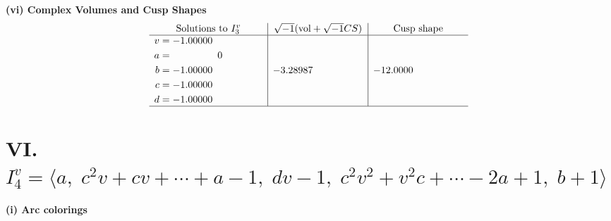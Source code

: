 \documentclass[1p]{elsarticle_modified}
\theoremstyle{definition}
\newcommand{\I}{\sqrt{-1}}
\begin{document}
\newpage\flushleft \textbf{(vi) Complex Volumes and Cusp Shapes}
$$\begin{array}{c|c|c}  
\text{Solutions to }I^v_{3}& \I (\text{vol} + \sqrt{-1}CS) & \text{Cusp shape}\\
 \hline 
\begin{aligned}
v &= -1.00000\phantom{ +0.000000I} \\
a &= \phantom{-0.000000 } 0 \\
b &= -1.00000\phantom{ +0.000000I} \\
c &= -1.00000\phantom{ +0.000000I} \\
d &= -1.00000\phantom{ +0.000000I}\end{aligned}
 & -3.28987\phantom{ +0.000000I} & -12.0000\phantom{ +0.000000I}\\
 \hline 
 \end{array}$$\newpage\newpage\renewcommand{\arraystretch}{1}
\centering \section*{VI. $I^v_{4}= \langle a,\;c^2 v+c v+\cdots+a-1,\;d v-1,\;c^2 v^2+v^2 c+\cdots-2 a+1,\;b+1 \rangle$}
\flushleft \textbf{(i) Arc colorings}\\
\end{document}
